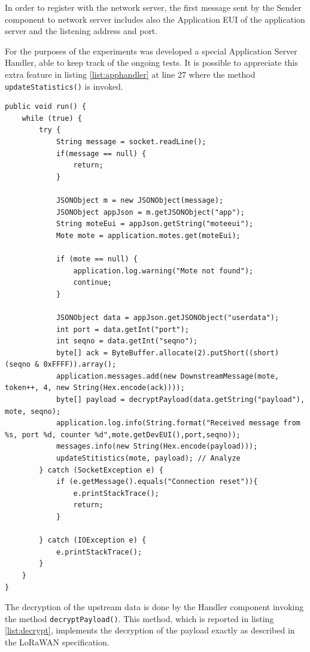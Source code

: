 In order to register with the network server, the first message sent by the Sender component to network server includes also the Application EUI of the application server and the listening address and port.

For the purposes of the experiments was developed a special Application Server Handler, able to keep track of the ongoing tests. It is possible to appreciate this extra feature in listing \ref{list:apphandler} at line 27 where the method \texttt{updateStatistics()} is invoked.


\begin{lstlisting}[caption=Main function of ApplicationServerHandler.java\label{list:apphandler}]
public void run() {
    while (true) {
        try {
            String message = socket.readLine();
            if(message == null) {
                return;
            }

            JSONObject m = new JSONObject(message);
            JSONObject appJson = m.getJSONObject("app");
            String moteEui = appJson.getString("moteeui");
            Mote mote = application.motes.get(moteEui);

            if (mote == null) {
                application.log.warning("Mote not found");
                continue;
            }

            JSONObject data = appJson.getJSONObject("userdata");
            int port = data.getInt("port");
            int seqno = data.getInt("seqno");
            byte[] ack = ByteBuffer.allocate(2).putShort((short) (seqno & 0xFFFF)).array();
            application.messages.add(new DownstreamMessage(mote, token++, 4, new String(Hex.encode(ack))));
            byte[] payload = decryptPayload(data.getString("payload"), mote, seqno);
            application.log.info(String.format("Received message from %s, port %d, counter %d",mote.getDevEUI(),port,seqno));
            messages.info(new String(Hex.encode(payload)));
            updateStitistics(mote, payload); // Analyze
        } catch (SocketException e) {
            if (e.getMessage().equals("Connection reset")){
                e.printStackTrace();
                return;
            }

        } catch (IOException e) {
            e.printStackTrace();
        }
    }
}
\end{lstlisting}
The decryption of the upstream data is done by the Handler component invoking the method \texttt{decryptPayload()}. This method, which is reported in listing \ref{list:decrypt}, implements the decryption of the payload exactly as described in the LoRaWAN specification. \cite{lorawanspec}

